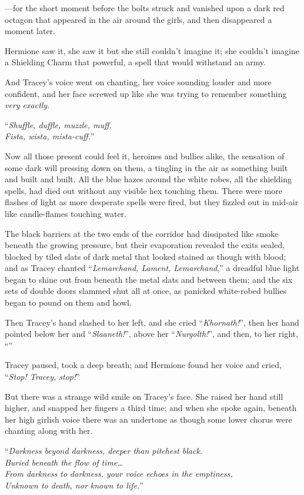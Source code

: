 —for the short moment before the bolts struck and vanished upon a dark red octagon that appeared in the air around the girls, and then disappeared a moment later.

Hermione saw it, she saw it but she still couldn’t imagine it; she couldn’t imagine a Shielding Charm that powerful, a spell that would withstand an army.

And Tracey’s voice went on chanting, her voice sounding louder and more confident, and her face screwed up like she was trying to remember something \emph{very exactly}.

“\emph{Shuffle, duffle, muzzle, muff.\\
Fista, wista, mista-cuff.}”

Now all those present could feel it, heroines and bullies alike, the sensation of some dark will pressing down on them, a tingling in the air as something built and built and built. All the blue hazes around the white robes, all the shielding spells, had died out without any visible hex touching them. There were more flashes of light as more desperate spells were fired, but they fizzled out in mid-air like candle-flames touching water.

The black barriers at the two ends of the corridor had dissipated like smoke beneath the growing pressure, but their evaporation revealed the exits sealed, blocked by tiled slats of dark metal that looked stained as though with blood; and as Tracey chanted “\emph{Lemarchand, Lament, Lemarchand},” a dreadful blue light began to shine out from beneath the metal slats and between them; and the six sets of double doors slammed shut all at once, as panicked white-robed bullies began to pound on them and howl.

Then Tracey’s hand slashed to her left, and she cried “\emph{Khornath!}”, then her hand pointed below her and “\emph{Slaaneth!}”, above her “\emph{Nurgolth!}”, and then, to her right, “”

Tracey paused, took a deep breath; and Hermione found her voice and cried, “\emph{Stop! Tracey, stop!}”

But there was a strange wild smile on Tracey’s face. She raised her hand still higher, and snapped her fingers a third time; and when she spoke again, beneath her high girlish voice there was an undertone as though some lower chorus were chanting along with her.

“\emph{Darkness beyond darkness, deeper than pitchest black.\\
Buried beneath the flow of time…\\
From darkness to darkness, your voice echoes in the emptiness,\\
Unknown to death, nor known to life.}”


